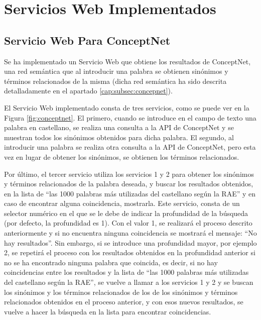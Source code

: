 \chapter{Servicios Web Implementados}
\label{cap:serviciosWebImplementados}


\section{Servicio Web Para ConceptNet}
\label{cap:sec:servicioConceptnet}

Se ha implementado un Servicio Web que obtiene los resultados de ConceptNet, una red semántica que al introducir una palabra se obtienen sinónimos y términos relacionados de la misma (dicha red semántica ha sido descrita detalladamente en el apartado \ref{cap:subsec:concepnet}).


El Servicio Web implementado consta de tres servicios, como se puede ver en la Figura \ref{fig:conceptnet}. El primero, cuando se introduce en el campo de texto una palabra en castellano, se realiza una consulta a la API de ConceptNet y se muestran todos los sinónimos obtenidos para dicha palabra. El segundo, al introducir una palabra se realiza otra consulta a la API de ConceptNet, pero esta vez en lugar de obtener los sinónimos, se obtienen los términos relacionados.

Por último, el tercer servicio utiliza los servicios 1 y 2 para obtener los sinónimos y términos relacionados de la palabra deseada, y buscar los resultados obtenidos, en la lista de ``las 1000 palabras más utilizadas del castellano según la RAE'' y en caso de encontrar alguna coincidencia, mostrarla. Este servicio, consta de un selector numérico en el que se le debe de indicar la profundidad de la búsqueda (por defecto, la profundidad es 1). Con el valor 1, se realizará el proceso descrito anteriormente y si no encuentra ninguna coincidencia se mostrará el mensaje: ``No hay resultados''. Sin embargo, si se introduce una profundidad mayor, por ejemplo 2, se repetirá el proceso con los resultados obtenidos en la profundidad anterior si no se ha encontrado ninguna palabra que coincida, es decir, si no hay coincidencias entre los resultados y la lista de ``las 1000 palabras más utilizadas del castellano según la RAE'', se vuelve a llamar a los servicios 1 y 2 y se buscan los sinónimos y los términos relacionados de los de los sinónimos y términos relacionados obtenidos en el proceso anterior, y con esos nuevos resultados, se vuelve a hacer la búsqueda en la lista para encontrar coincidencias.

